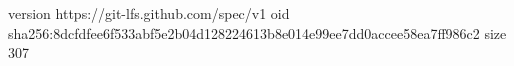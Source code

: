 version https://git-lfs.github.com/spec/v1
oid sha256:8dcfdfee6f533abf5e2b04d128224613b8e014e99ee7dd0accee58ea7ff986c2
size 307
